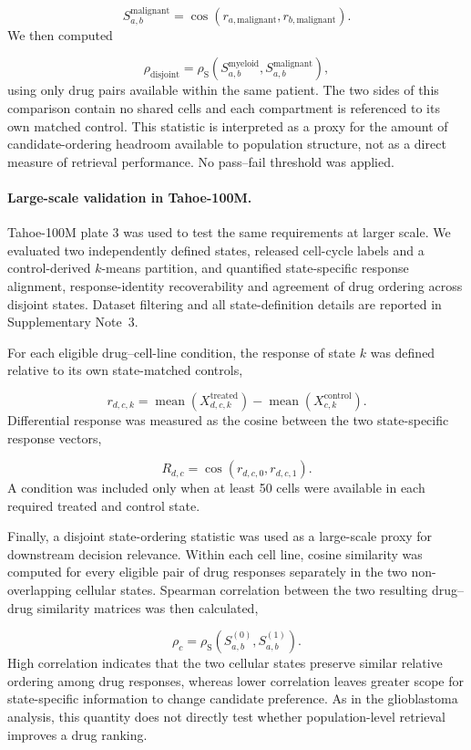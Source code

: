 \documentclass[11pt,letterpaper]{article}
\begin{document}
\[
S^{\mathrm{malignant}}_{a,b}
=
\cos
\left(
r_{a,\mathrm{malignant}},
r_{b,\mathrm{malignant}}
\right).
\]
We then computed

\[
\rho_{\mathrm{disjoint}}
=
\rho_{\mathrm{S}}
\left(
S^{\mathrm{myeloid}}_{a,b},
S^{\mathrm{malignant}}_{a,b}
\right),
\]
using only drug pairs available within the same patient. The two sides of this comparison contain
no shared cells and each compartment is referenced to its own matched control. This statistic is
interpreted as a proxy for the amount of candidate-ordering headroom available to population
structure, not as a direct measure of retrieval performance. No pass--fail threshold was applied.

\paragraph{Large-scale validation in Tahoe-100M.}
Tahoe-100M plate 3 was used to test the same requirements at larger scale. We evaluated two
independently defined states, released cell-cycle labels and a control-derived $k$-means partition,
and quantified state-specific response alignment, response-identity recoverability and agreement
of drug ordering across disjoint states. Dataset filtering and all state-definition details are
reported in Supplementary Note~3.

For each eligible drug--cell-line condition, the response of state $k$ was defined relative to its
own state-matched controls,

\[
r_{d,c,k}
=
\operatorname{mean}
\left(
X^{\mathrm{treated}}_{d,c,k}
\right)
-
\operatorname{mean}
\left(
X^{\mathrm{control}}_{c,k}
\right).
\]
Differential response was measured as the cosine between the two state-specific response vectors,

\[
R_{d,c}
=
\cos
\left(
r_{d,c,0},
r_{d,c,1}
\right).
\]
A condition was included only when at least 50 cells were available in each required treated and
control state.

Finally, a disjoint state-ordering statistic was used as a large-scale proxy for downstream
decision relevance. Within each cell line, cosine similarity was computed for every eligible pair
of drug responses separately in the two non-overlapping cellular states. Spearman correlation
between the two resulting drug--drug similarity matrices was then calculated,

\[
\rho_c
=
\rho_{\mathrm{S}}
\left(
S^{(0)}_{a,b},
S^{(1)}_{a,b}
\right).
\]
High correlation indicates that the two cellular states preserve similar relative ordering among
drug responses, whereas lower correlation leaves greater scope for state-specific information to
change candidate preference. As in the glioblastoma analysis, this quantity does not directly test
whether population-level retrieval improves a drug ranking.
\end{document}
